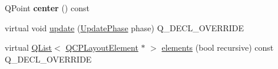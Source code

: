 \begin{DoxyCompactItemize}
\item 
Q\+Point {\bfseries center} () const \hypertarget{class_q_c_p_axis_rect_aea5e6042bca198424fa1bc02fc282e59}{}\label{class_q_c_p_axis_rect_aea5e6042bca198424fa1bc02fc282e59}

\item 
virtual void \hyperlink{class_q_c_p_axis_rect_a8c9f5555c257955648465e8293adb7ef}{update} (\hyperlink{class_q_c_p_layout_element_a0d83360e05735735aaf6d7983c56374d}{Update\+Phase} phase) Q\+\_\+\+D\+E\+C\+L\+\_\+\+O\+V\+E\+R\+R\+I\+DE
\item 
virtual \hyperlink{class_q_list}{Q\+List}$<$ \hyperlink{class_q_c_p_layout_element}{Q\+C\+P\+Layout\+Element} $\ast$ $>$ \hyperlink{class_q_c_p_axis_rect_a516deca38a227006634ecb0456096982}{elements} (bool recursive) const Q\+\_\+\+D\+E\+C\+L\+\_\+\+O\+V\+E\+R\+R\+I\+DE
\end{DoxyCompactItemize}
